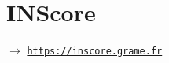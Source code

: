 
\section{INScore}
\label{inscore}

$\rightarrow$ \href{https://inscore.grame.fr}{\texttt{\small https://inscore.grame.fr}}




